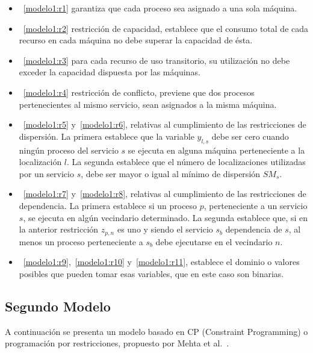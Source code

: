 \documentclass[../informe2.tex]{subfiles}
\begin{document}
\begin{itemize}
	\item~\eqref{modelo1:r1} garantiza que cada proceso sea asignado a una sola máquina.
	\item~\eqref{modelo1:r2} restricción de capacidad, establece que el consumo total de cada recurso en cada máquina no debe superar la capacidad de ésta.
	\item~\eqref{modelo1:r3} para cada recurso de uso transitorio, su utilización no debe exceder la capacidad dispuesta por las máquinas.
	\item~\eqref{modelo1:r4} restricción de conflicto, previene que dos procesos pertenecientes al mismo servicio, sean asignados a la misma máquina.
	\item~\eqref{modelo1:r5} y~\eqref{modelo1:r6}, relativas al cumplimiento de las restricciones de dispersión. La primera establece que la variable $y_{l,s}$ debe ser cero cuando ningún proceso del servicio $s$ se ejecuta en alguna máquina perteneciente a la localización $l$. La segunda establece que el número de localizaciones utilizadas por un servicio $s$, debe ser mayor o igual al mínimo de dispersión $SM_s$.
	\item~\eqref{modelo1:r7} y~\eqref{modelo1:r8}, relativas al cumplimiento de las restricciones de dependencia. La primera establece si un proceso $p$, perteneciente a un servicio $s$, se ejecuta en algún vecindario determinado. La segunda establece que, si en la anterior restricción $z_{p,n}$ es uno y siendo el servicio $s_b$ dependencia de $s$, al menos un proceso perteneciente a $s_b$ debe ejecutarse en el vecindario $n$.
	\item~\eqref{modelo1:r9},~\eqref{modelo1:r10} y~\eqref{modelo1:r11}, establece el dominio o valores posibles que pueden tomar esas variables, que en este caso son binarias.
\end{itemize}

\subsection{Segundo Modelo}
A continuación se presenta un modelo basado en CP (Constraint Programming) o programación por restricciones, propuesto por Mehta et al.~\cite{mehta2012comparing}.
\end{document}

